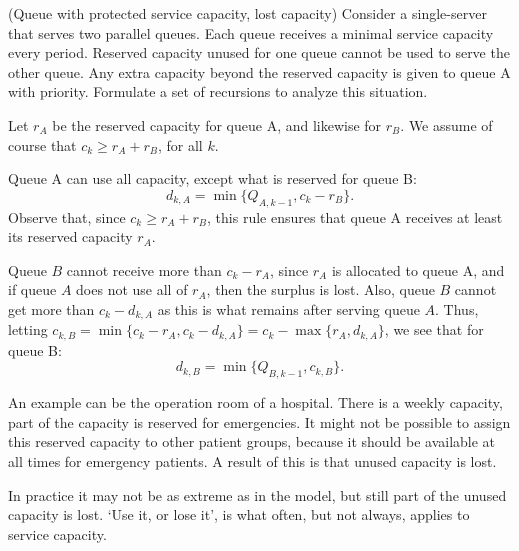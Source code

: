 \begin{question} 
  (Queue with protected service capacity, lost capacity) Consider a
  single-server that serves two parallel queues. Each queue receives a
  minimal service capacity every period. Reserved capacity unused for
  one queue cannot be used to serve the other queue. Any extra
  capacity beyond the reserved capacity is given to queue A with
  priority. Formulate a set of recursions to analyze this situation.

  Let $r_A$ be the reserved capacity for queue A, and likewise for
   $r_B$. We assume of course that $c_k\geq r_A + r_B$, for all $k$.

   \begin{solution} Queue A can use all capacity, except what is
     reserved for queue B:
\begin{equation*}
  d_{k,A} = \min\{Q_{A, k-1}, c_k - r_B\}.
\end{equation*}
Observe that, since $c_k \geq r_A + r_B$, this rule ensures that queue
A receives at least its reserved capacity $r_A$.

Queue $B$ cannot receive more than $c_k-r_A$, since $r_A$ is allocated
to queue A, and if queue $A$ does not use all of $r_A$, then the
surplus is lost. Also, queue $B$ cannot get more than $c_k - d_{k,A}$
as this is what remains after serving queue $A$. Thus, letting
$c_{k,B} = \min\{c_k-r_A, c_k-d_{k,A}\} = c_k - \max\{r_A, d_{k,A}\}$,
we see that for queue B:
\begin{equation*}
  d_{k,B} = \min\{Q_{B, k-1}, c_{k,B}\}.
\end{equation*}

An example can be the operation room of a hospital. There is a weekly
capacity, part of the capacity is reserved for emergencies. It might
not be possible to assign this reserved capacity to other patient
groups, because it should be available at all times for emergency
patients. A result of this is that unused capacity is lost.  

In practice it may not be as extreme as in the model, but still part
of the unused capacity is lost. `Use it, or lose it', is what often,
but not always, applies to service capacity.
  \end{solution}
\end{question}




